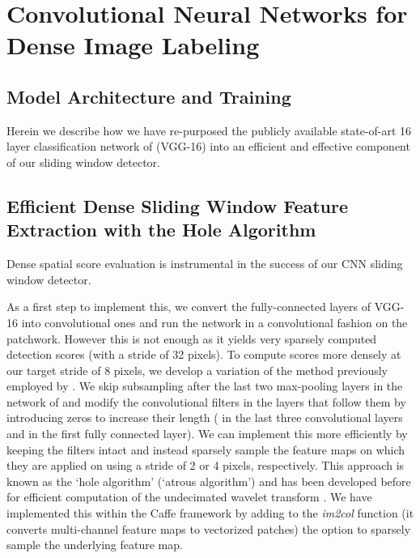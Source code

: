 \section{Convolutional Neural Networks for Dense Image Labeling}
\label{sec:convnets}

\subsection{Model Architecture and Training}
\label{sec:convnet-arch}

Herein we describe how we have re-purposed the publicly available state-of-art
16 layer classification network of \cite{simonyan2014very} (VGG-16) into an efficient
and effective component of our sliding window detector.

\subsection{Efficient Dense Sliding Window Feature Extraction with the Hole Algorithm}
\label{sec:convnet-hole}

Dense spatial score evaluation is instrumental in the success of our CNN
sliding window detector. 

As a first step to implement this, we convert the fully-connected layers
of VGG-16 into convolutional ones and run the network in a convolutional
fashion on the patchwork. However this is not enough as it yields very
sparsely computed detection scores (with a stride of 32 pixels). To compute
scores more densely at our target stride of 8 pixels, we develop a variation
of the method previously employed by \cite{GCMG+13, sermanet2013overfeat}. We skip
subsampling after the last two max-pooling layers in the network of
\cite{simonyan2014very} and modify the convolutional filters in the layers that follow
them by introducing zeros to increase their length ( in the last three
convolutional layers and  in the first fully connected layer). We can
implement this more efficiently by keeping the filters intact and instead
sparsely sample the feature maps on which they are applied on using a stride
of 2 or 4 pixels, respectively. This approach is known as the `hole algorithm'
(`atrous algorithm') and has been developed before for efficient computation
of the undecimated wavelet transform \cite{Mall99}. We have implemented this
within the Caffe framework by adding to the \textsl{im2col} function (it
converts multi-channel feature maps to vectorized patches) the option to
sparsely sample the underlying feature map.


